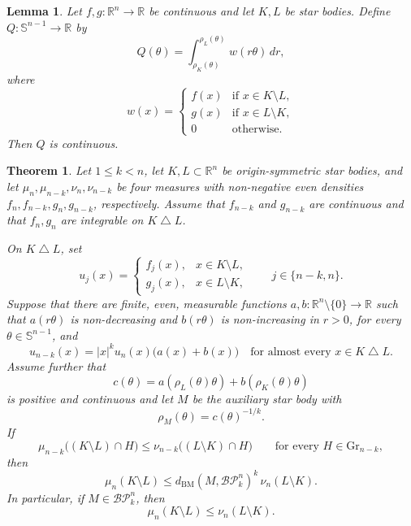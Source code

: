 \documentclass[10pt,a4paper]{amsart}
\newtheorem{theorem}{Theorem}
\newtheorem{lemma}{Lemma}
\newcommand{\BP}{\mathcal{BP}}
\newcommand{\Gr}{\mathrm{Gr}}
\newcommand{\R}{\mathbb{R}}
\newcommand{\Sph}{\mathbb{S}}
\newcommand{\dd}{\,d}
\begin{document}
\begin{lemma}\label{lem:continuity}
Let $f,g:\R^n\to\R$ be continuous and let $K,L$ be star bodies. Define
$Q:\Sph^{n-1}\to\R$ by
\[
 Q(\theta)=\int_{\rho_K(\theta)}^{\rho_L(\theta)}w(r\theta)\dd r,
\]
where
\[
 w(x)=
 \begin{cases}
  f(x)&\text{if }x\in K\setminus L,\\
  g(x)&\text{if }x\in L\setminus K,\\
  0&\text{otherwise.}
 \end{cases}
\]
Then $Q$ is continuous.
\end{lemma}

\begin{theorem}\label{thm:main}
Let $1\leq k<n$, let $K,L\subset\R^n$ be origin-symmetric star bodies, and
let $\mu_n,\mu_{n-k},\nu_n,\nu_{n-k}$ be four measures with non-negative even densities
$f_n,f_{n-k},g_n,g_{n-k}$, respectively. Assume that $f_{n-k}$ and
$g_{n-k}$ are continuous and that $f_n,g_n$ are integrable on
$K\mathbin\triangle L$.

On $K\mathbin\triangle L$, set
\[
 u_j(x)=
 \begin{cases}
  f_j(x),&x\in K\setminus L,\\
  g_j(x),&x\in L\setminus K,
 \end{cases}
 \qquad j\in\{n-k,n\}.
\]
Suppose that there are finite, even, measurable functions
$a,b:\R^n\setminus\{0\}\to\R$ such that $a(r\theta)$ is non-decreasing and
$b(r\theta)$ is non-increasing in $r>0$, for every
$\theta\in\Sph^{n-1}$, and
\begin{equation}\label{eq:factorization}
 u_{n-k}(x)=|x|^k u_n(x)\bigl(a(x)+b(x)\bigr)
 \quad\text{for almost every }x\in K\mathbin\triangle L.
\end{equation}
Assume further that
\begin{equation}\label{eq:M}
 c(\theta)
 =a(\rho_L(\theta)\theta)+b(\rho_K(\theta)\theta)
\end{equation}
is positive and continuous and let $M$ be the auxiliary star body with
\[
 \rho_M(\theta)=c(\theta)^{-1/k}.
\]
If
\begin{equation}\label{eq:section-hypothesis}
 \mu_{n-k}\bigl((K\setminus L)\cap H\bigr)
 \leq
 \nu_{n-k}\bigl((L\setminus K)\cap H\bigr)
 \qquad\text{for every }H\in\Gr_{n-k},
\end{equation}
then
\begin{equation}\label{eq:main-conclusion}
 \mu_n(K\setminus L)
 \leq d_{\mathrm{BM}}(M,\BP_k^n)^k\,
       \nu_n(L\setminus K).
\end{equation}
In particular, if $M\in\BP_k^n$, then
\[
 \mu_n(K\setminus L)\leq\nu_n(L\setminus K).
\]
\end{theorem}
\end{document}
